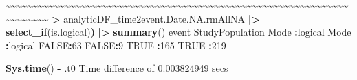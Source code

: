 \documentclass[
]{article}
\newenvironment{Shaded}{\begin{snugshade}}{\end{snugshade}}
\newcommand{\ConstantTok}[1]{\textcolor[rgb]{0.56,0.35,0.01}{#1}}
\newcommand{\DecValTok}[1]{\textcolor[rgb]{0.00,0.00,0.81}{#1}}
\newcommand{\ErrorTok}[1]{\textcolor[rgb]{0.64,0.00,0.00}{\textbf{#1}}}
\newcommand{\FloatTok}[1]{\textcolor[rgb]{0.00,0.00,0.81}{#1}}
\newcommand{\FunctionTok}[1]{\textcolor[rgb]{0.13,0.29,0.53}{\textbf{#1}}}
\newcommand{\NormalTok}[1]{#1}
\newcommand{\SpecialCharTok}[1]{\textcolor[rgb]{0.81,0.36,0.00}{\textbf{#1}}}
\begin{document}
\begin{Shaded}
\begin{Highlighting}[]
    \SpecialCharTok{\textasciitilde{}}\ErrorTok{\textasciitilde{}\textasciitilde{}\textasciitilde{}\textasciitilde{}\textasciitilde{}\textasciitilde{}\textasciitilde{}\textasciitilde{}\textasciitilde{}\textasciitilde{}\textasciitilde{}\textasciitilde{}\textasciitilde{}\textasciitilde{}\textasciitilde{}\textasciitilde{}\textasciitilde{}\textasciitilde{}\textasciitilde{}\textasciitilde{}\textasciitilde{}\textasciitilde{}\textasciitilde{}\textasciitilde{}\textasciitilde{}\textasciitilde{}\textasciitilde{}\textasciitilde{}\textasciitilde{}\textasciitilde{}\textasciitilde{}\textasciitilde{}\textasciitilde{}\textasciitilde{}\textasciitilde{}\textasciitilde{}\textasciitilde{}\textasciitilde{}\textasciitilde{}\textasciitilde{}\textasciitilde{}\textasciitilde{}\textasciitilde{}\textasciitilde{}\textasciitilde{}\textasciitilde{}\textasciitilde{}\textasciitilde{}\textasciitilde{}\textasciitilde{}\textasciitilde{}\textasciitilde{}\textasciitilde{}\textasciitilde{}\textasciitilde{}\textasciitilde{}\textasciitilde{}\textasciitilde{}\textasciitilde{}\textasciitilde{}\textasciitilde{}\textasciitilde{}\textasciitilde{}\textasciitilde{}\textasciitilde{}\textasciitilde{}\textasciitilde{}\textasciitilde{}\textasciitilde{}\textasciitilde{}\textasciitilde{}}    
 \ErrorTok{\textgreater{}}\NormalTok{ analyticDF\_time2event.Date.NA.rmAllNA }\SpecialCharTok{|\textgreater{}} \FunctionTok{select\_if}\NormalTok{(is.logical)}\ErrorTok{)} \SpecialCharTok{|\textgreater{}} \FunctionTok{summary}\NormalTok{()  }
\NormalTok{   event         StudyPopulation}
\NormalTok{ Mode }\SpecialCharTok{:}\NormalTok{logical   Mode }\SpecialCharTok{:}\NormalTok{logical  }
 \ConstantTok{FALSE}\SpecialCharTok{:}\DecValTok{63}        \ConstantTok{FALSE}\SpecialCharTok{:}\DecValTok{9}        
 \ConstantTok{TRUE} \SpecialCharTok{:}\DecValTok{165}       \ConstantTok{TRUE} \SpecialCharTok{:}\DecValTok{219}      
\end{Highlighting}
\end{Shaded}

\begin{Shaded}
\begin{Highlighting}[]
\FunctionTok{Sys.time}\NormalTok{() }\SpecialCharTok{{-}}\NormalTok{ .t0}
\NormalTok{Time difference of }\FloatTok{0.003824949}\NormalTok{ secs}
\end{Highlighting}
\end{Shaded}
\end{document}
